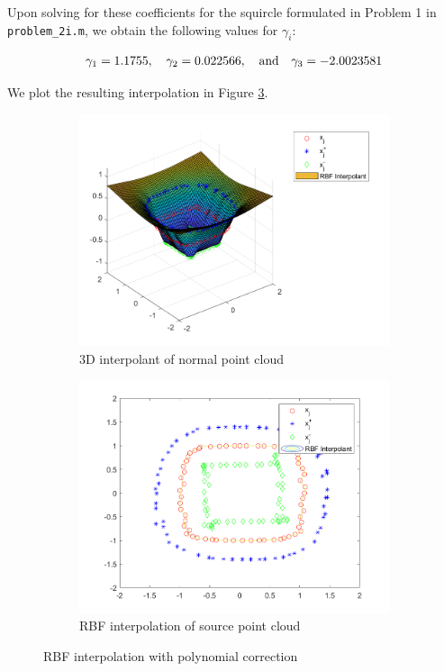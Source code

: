 \begin{solution}
    Upon solving for these coefficients for the squircle formulated in Problem 1 in \texttt{problem\_2i.m}, we obtain 
    the following values for $\gamma_i$:

    $$
        \gamma_1 = 1.1755, \quad \gamma_2 = 0.022566, \quad \text{and} \quad \gamma_3 = -2.0023581 \\
    $$
   
    We plot the resulting interpolation in Figure \ref{fig:problem_2i}.
    \begin{figure}[h]
        \centering
        \begin{subfigure}{0.49\textwidth}
            \includegraphics[width=\textwidth]{problem_2i_interpolant_3d.png}
            \caption{3D interpolant of normal point cloud}
            \label{fig:problem_2i_interpolant_3d}
        \end{subfigure}
        \begin{subfigure}{0.49\textwidth}
            \includegraphics[width=\textwidth]{problem_2i_interpolant_2d.png}
            \caption{RBF interpolation of source point cloud}
            \label{fig:problem_2i_interpolant_2d}
        \end{subfigure}
        \caption{RBF interpolation with polynomial correction}
        \label{fig:problem_2i}
    \end{figure}
\end{solution}